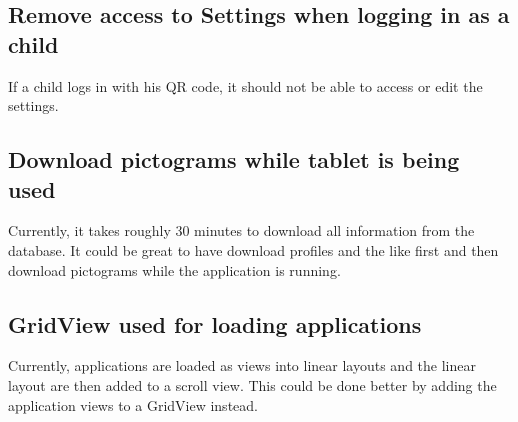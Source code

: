 \subsection{Remove access to Settings when logging in as a child}

If a child logs in with his QR code, it should not be able to access or edit the settings.

\subsection{Download pictograms while tablet is being used}
Currently, it takes roughly 30 minutes to download all information from the database.
It could be great to have \launcher download profiles and the like first and then download pictograms while the application is running.

\subsection{GridView used for loading applications}

Currently, applications are loaded as views into linear layouts and the linear layout are then added to a scroll view.
This could be done better by adding the application views to a GridView instead.